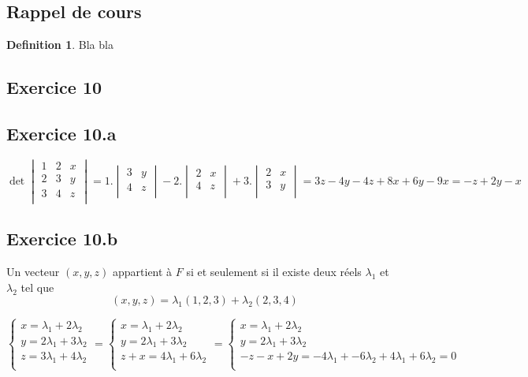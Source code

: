 \documentclass[]{book}
\theoremstyle{definition}
\newtheorem{defn}{Definition}
\begin{document}
\subsection*{Rappel de cours}
\begin{defn}
Bla bla
\end{defn}



\newpage
\subsection*{Exercice 10}
\subsection*{Exercice 10.a}

$$\det
\begin{vmatrix}
1 & 2 & x \\
2 & 3 & y \\
3 & 4 & z \\
\end{vmatrix}
= 1. \begin{vmatrix} 3 & y \\ 4 & z \\ \end{vmatrix} -2. \begin{vmatrix} 2 & x \\ 4 & z \\ \end{vmatrix} + 3. \begin{vmatrix} 2 & x \\ 3 & y \\ \end{vmatrix} = 3z - 4y -4z + 8x +6y - 9x = -z + 2y - x
$$

\subsection*{Exercice 10.b}
Un vecteur $(x,y,z)$ appartient à $F$ si et seulement si il existe deux r\'eels $\lambda_1$ et $\lambda_2$ tel que 
$$
(x,y,z)=\lambda_1(1,2,3)+\lambda_2(2,3,4)
$$

$$
\left\{
\begin{array}{l}
x = \lambda_1 + 2 \lambda_2 \\
y = 2\lambda_1 + 3 \lambda_2 \\
z = 3\lambda_1 + 4 \lambda_2 \\
\end{array}
\right.
=
\left\{
\begin{array}{l}
x = \lambda_1 + 2 \lambda_2 \\
y = 2\lambda_1 + 3 \lambda_2 \\
z+x = 4\lambda_1 + 6 \lambda_2 \\
\end{array}
\right.
=
\left\{
\begin{array}{l}
x = \lambda_1 + 2 \lambda_2 \\
y = 2\lambda_1 + 3 \lambda_2 \\
-z-x+2y = -4\lambda_1 + -6 \lambda_2 + 4\lambda_1 + 6 \lambda_2 = 0 \\
\end{array}
\right.
$$
\end{document}
